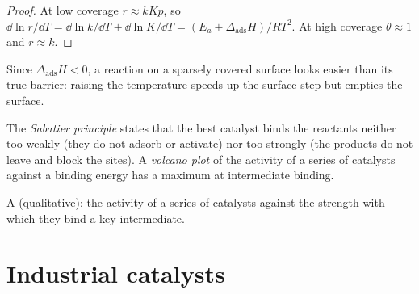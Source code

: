 \begin{proof}
At low coverage $r \approx kKp$, so $\dd\ln r/\dd T = \dd\ln k/\dd T + \dd\ln K/\dd T = (E_a + \Delta_{\mathrm{ads}}H)/RT^2$.
At high coverage $\theta \approx 1$ and $r \approx k$.
\end{proof}

Since $\Delta_{\mathrm{ads}}H < 0$, a reaction on a sparsely covered surface looks easier than its
true barrier: raising the temperature speeds up the surface step but empties
the surface.

\begin{definition}\label{def:b3:surfaces-catalysis:sabatier}
The \emph{Sabatier principle} states that the best
catalyst binds the reactants neither too weakly (they do not adsorb or
activate) nor too strongly (the products do not leave and block the sites). A
\emph{volcano plot} of the activity of a series of
catalysts against a binding energy has a maximum at intermediate binding.
\end{definition}

\begin{omfigure}

{\small A  (qualitative): the activity of a series of catalysts
against the strength with which they bind a key intermediate.}
\end{omfigure}

\section{Industrial catalysts}

